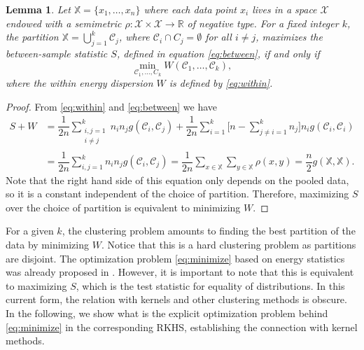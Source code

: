\documentclass[aps,preprint,nofootinbib,floatfix]{revtex4-1}
\newtheorem{lemma}[theorem]{Lemma}
\newcommand\C{{\mathcal{C}}}
\begin{document}
\begin{lemma}
\label{th:minimize}
Let $\mathbb{X} = \{x_1,\dotsc,x_n\}$ where each data point
$x_i$ lives in a space $\mathcal{X}$ endowed with a semimetric $\rho:
\mathcal{X}\times\mathcal{X} \to \mathbb{R}$ of
negative type. For a fixed integer $k$,
the partition
$\mathbb{X} = \bigcup_{j=1}^k \C_j$, where $\C_i \cap C_j = \emptyset$ for
all $i\ne j$, maximizes the between-sample statistic $S$, defined
in equation \eqref{eq:between}, if and only if
\begin{equation}
\label{eq:minimize}
\min_{\C_1,\dotsc,C_k  } W(
\C_1, \dotsc, \C_k),
\end{equation}
where the within energy dispersion $W$ is defined by \eqref{eq:within}.
\end{lemma}
\begin{proof}
From \eqref{eq:within} and \eqref{eq:between}
we have
\begin{equation}
\begin{split}
S + W &= 
\dfrac{1}{2n} \sum_{\substack{i,j=1 \\ i\ne j}}^k n_i n_j g(\C_i, \C_j)
+ \dfrac{1}{2n} \sum_{i=1}^{k} 
\bigg[ n - 
\sum_{j\ne i = 1}^k n_j \bigg] 
n_i g(\C_i, \C_i) \\
& = \dfrac{1}{2n} \sum_{i,j=1}^k n_i n_j g(\C_i, \C_j)
= \dfrac{1}{2n} \sum_{x \in \mathbb{X}} \sum_{y \in \mathbb{X}} \rho(x,y)
= \dfrac{n}{2} g(\mathbb{X}, \mathbb{X}).
\end{split}
\end{equation}
Note that the right hand side of this equation 
only depends on the pooled data, so it is a constant
independent of the choice of partition. Therefore, maximizing
$S$ over the choice of partition is equivalent to minimizing $W$.
\end{proof}

For a given $k$, the clustering problem amounts to
finding the best partition of the data by minimizing $W$.
Notice that this is a hard clustering problem as partitions
are disjoint. The optimization problem \eqref{eq:minimize} based on
energy statistics was already proposed in \cite{Kgroups}. However, it is
important to note that this is equivalent to maximizing $S$,
which is the test statistic for equality of distributions. In this current
form, the relation with kernels and other clustering methods is obscure.
In the following, we show what is the explicit optimization problem behind 
\eqref{eq:minimize} in the corresponding RKHS, 
establishing the connection with kernel methods.
\end{document}
